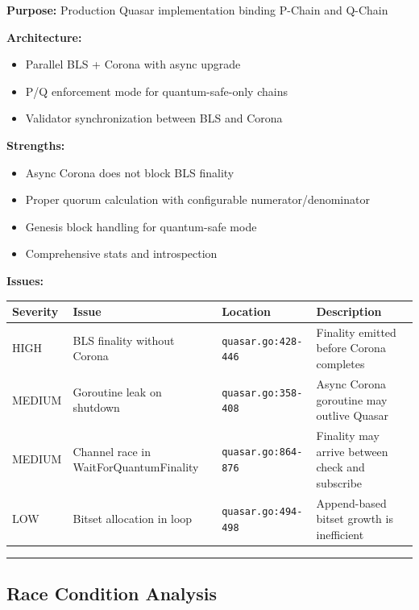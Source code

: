 \documentclass[
]{article}
\newcounter{none} %
\providecommand{\tightlist}{%
  \setlength{\itemsep}{0pt}\setlength{\parskip}{0pt}}
\begin{document}
\textbf{Purpose:} Production Quasar implementation binding P-Chain and
Q-Chain

\textbf{Architecture:}

\begin{itemize}
\tightlist
\item
  Parallel BLS + Corona with async upgrade
\item
  P/Q enforcement mode for quantum-safe-only chains
\item
  Validator synchronization between BLS and Corona
\end{itemize}

\textbf{Strengths:}

\begin{itemize}
\tightlist
\item
  Async Corona does not block BLS finality
\item
  Proper quorum calculation with configurable numerator/denominator
\item
  Genesis block handling for quantum-safe mode
\item
  Comprehensive stats and introspection
\end{itemize}

\textbf{Issues:}

{\def\LTcaptype{none} %
\begin{longtable}[]{@{}llll@{}}
\toprule\noalign{}
Severity & Issue & Location & Description \\
\midrule\noalign{}
\endhead
\bottomrule\noalign{}
\endlastfoot
HIGH & BLS finality without Corona & \texttt{quasar.go:428-446} &
Finality emitted before Corona completes \\
MEDIUM & Goroutine leak on shutdown & \texttt{quasar.go:358-408} & Async
Corona goroutine may outlive Quasar \\
MEDIUM & Channel race in WaitForQuantumFinality &
\texttt{quasar.go:864-876} & Finality may arrive between check and
subscribe \\
LOW & Bitset allocation in loop & \texttt{quasar.go:494-498} &
Append-based bitset growth is inefficient \\
\end{longtable}
}

\begin{center}\rule{0.5\linewidth}{0.5pt}\end{center}

\subsection{Race Condition Analysis}\label{race-condition-analysis}
\end{document}
